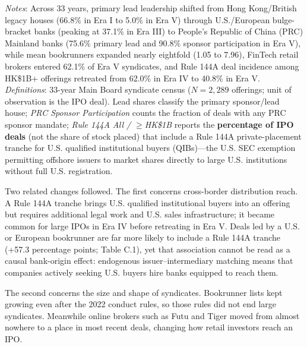 \documentclass[11pt,letterpaper]{article}
\begin{document}
\begin{table}[!htbp]
\par\vspace{3pt}\noindent\parbox{\textwidth}{\scriptsize\raggedright \textit{Notes}: Across 33 years, primary lead leadership shifted from Hong Kong/British legacy houses (66.8\% in Era I to 5.0\% in Era V) through U.S./European bulge-bracket banks (peaking at 37.1\% in Era III) to People's Republic of China (PRC) Mainland banks (75.6\% primary lead and 90.8\% sponsor participation in Era V), while mean bookrunners expanded nearly eightfold (1.05 to 7.96), FinTech retail brokers entered 62.1\% of Era V syndicates, and Rule 144A deal incidence among HK\$1B+ offerings retreated from 62.0\% in Era IV to 40.8\% in Era V. \textit{Definitions}: 33-year Main Board syndicate census ($N = 2,289$ offerings; unit of observation is the IPO deal). Lead shares classify the primary sponsor/lead house; \textit{PRC Sponsor Participation} counts the fraction of deals with any PRC sponsor mandate; \textit{Rule 144A All / $\ge$HK\$1B} reports the \textbf{percentage of IPO deals} (not the share of stock placed) that include a Rule 144A private-placement tranche for U.S. qualified institutional buyers (QIBs)—the U.S. SEC exemption permitting offshore issuers to market shares directly to large U.S. institutions without full U.S. registration.}
\end{table}

Two related changes followed. The first concerns cross-border distribution reach. A Rule 144A tranche brings U.S. qualified institutional buyers into an offering but requires additional legal work and U.S. sales infrastructure; it became common for large IPOs in Era IV before retreating in Era V. Deals led by a U.S. or European bookrunner are far more likely to include a Rule 144A tranche (+57.3 percentage points; Table C.1), yet that association cannot be read as a causal bank-origin effect: endogenous issuer–intermediary matching means that companies actively seeking U.S. buyers hire banks equipped to reach them.

The second concerns the size and shape of syndicates. Bookrunner lists kept growing even after the 2022 conduct rules, so those rules did not end large syndicates. Meanwhile online brokers such as Futu and Tiger moved from almost nowhere to a place in most recent deals, changing how retail investors reach an IPO.
\end{document}
